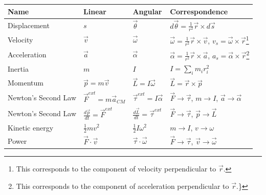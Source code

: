 \begin{table}
\centering
\begin{tabular}{p{}p{}p{}p{}}
\toprule
\textbf{Name} & \textbf{Linear} & \textbf{Angular} & \textbf{Correspondence} \\
\hline
Displacement & $s$ & $\vec \theta$ & $d\vec\theta=\frac{1}{r^2} \vec r\times d\vec s$ \\
Velocity & $\vec v$ & $\vec \omega$ & $\vec\omega=\frac{1}{r^2} \vec r\times \vec v$, $v_s = \vec\omega\times \vec r$\footnote{This corresponds to the component of velocity perpendicular to $\vec r$.} \\
Acceleration & $\vec a$ & $\vec \alpha$ & $\vec\alpha=\frac{1}{r^2} \vec r\times \vec a$, $a_s = \vec\alpha\times \vec r$\footnote{This corresponds to the component of acceleration perpendicular to $\vec r$.\}} \\
Inertia & $m$ & $I$ & $I=\sum_i m_ir_i^2$ \\
Momentum & $\vec p=m\vec v$ & $\vec L = I\vec \omega$ & $\vec L = \vec r\times \vec p$ \\
Newton's Second Law & $\vec F^{ext}=m\vec a_{CM}$ & $\vec \tau^{ext} = I\vec\alpha$ & $\vec F \to \vec\tau$, $m\to I$, $\vec a \to \vec \alpha$ \\
Newton's Second Law & $\frac{d\vec p}{dt} =\vec F^{ext}$ & $\frac{d\vec L}{dt} =\vec \tau^{ext}$ & $\vec F \to \vec\tau$, $\vec p \to \vec L$ \\
Kinetic energy & $\frac{1}{2}mv^2$ & $\frac{1}{2}I\omega^2$ & $m\to I$, $v\to \omega$ \\
Power & $\vec F \cdot \vec v$ & $\vec \tau \cdot \vec\omega$ & $\vec F \to \vec\tau$, $\vec v\to \vec\omega$ \\
\bottomrule
\end{tabular}
\end{table}

